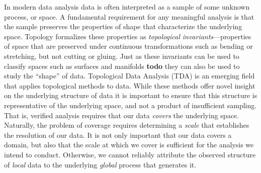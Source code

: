 
In modern data analysis data is often interpreted as a sample of some unknown process, or space.
A fundamental requirement for any meaningful analysis is that the sample preserves the properties of shape that characterize the underlying space.
Topology formalizes these properties as \emph{topological invariants}---properties of space that are preserved under continuous transformations such as bending or stretching, but not cutting or gluing.
Just as these invariants can be used to classify spaces such as surfaces and manifolds \textbf{todo} they can also be used to study the ``shape'' of data.
Topological Data Analysis (TDA) is an emerging field that applies topological methods to data.
While these methods offer novel insight on the underlying structure of data it is important to ensure that this structure is representative of the underlying space, and not a product of insufficient sampling.
That is, verified analysis requires that our data \emph{covers} the underlying space.
Naturally, the problem of coverage requires determining a \emph{scale} that establishes the resolution of our data.
It is not only important that our data covers a domain, but also that the scale at which we cover is sufficient for the analysis we intend to conduct.
Otherwise, we cannot reliably attribute the observed structure of \emph{local} data to the underlying \emph{global} process that generates it.


